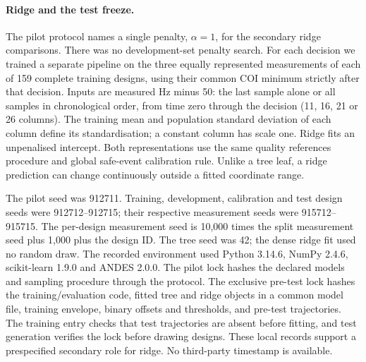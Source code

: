 \documentclass[10pt]{article}
\begin{document}
\paragraph{Ridge and the test freeze.} The pilot protocol names a single penalty, $\alpha=1$, for the secondary ridge comparisons. There was no development-set penalty search. For each decision we trained a separate pipeline on the three equally represented measurements of each of 159 complete training designs, using their common COI minimum strictly after that decision. Inputs are measured Hz minus 50: the last sample alone or all samples in chronological order, from time zero through the decision (11, 16, 21 or 26 columns). The training mean and population standard deviation of each column define its standardisation; a constant column has scale one. Ridge fits an unpenalised intercept. Both representations use the same quality references procedure and global safe-event calibration rule. Unlike a tree leaf, a ridge prediction can change continuously outside a fitted coordinate range.

The pilot seed was 912711. Training, development, calibration and test design seeds were 912712--912715; their respective measurement seeds were 915712--915715. The per-design measurement seed is 10,000 times the split measurement seed plus 1,000 plus the design ID. The tree seed was 42; the dense ridge fit used no random draw. The recorded environment used Python 3.14.6, NumPy 2.4.6, scikit-learn 1.9.0 and ANDES 2.0.0. The pilot lock hashes the declared models and sampling procedure through the protocol. The exclusive pre-test lock hashes the training/evaluation code, fitted tree and ridge objects in a common model file, training envelope, binary offsets and thresholds, and pre-test trajectories. The training entry checks that test trajectories are absent before fitting, and test generation verifies the lock before drawing designs. These local records support a prespecified secondary role for ridge. No third-party timestamp is available.
\end{document}
